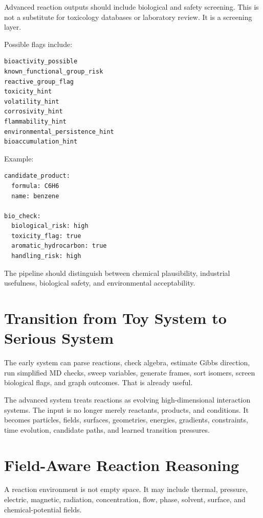 \documentclass[11pt]{article}
\begin{document}
Advanced reaction outputs should include biological and safety screening. This is not a substitute for toxicology databases or laboratory review. It is a screening layer.

Possible flags include:

\begin{lstlisting}[caption={Safety screening channels}]
bioactivity_possible
known_functional_group_risk
reactive_group_flag
toxicity_hint
volatility_hint
corrosivity_hint
flammability_hint
environmental_persistence_hint
bioaccumulation_hint
\end{lstlisting}

Example:

\begin{lstlisting}[caption={Example safety flag output}]
candidate_product:
  formula: C6H6
  name: benzene

bio_check:
  biological_risk: high
  toxicity_flag: true
  aromatic_hydrocarbon: true
  handling_risk: high
\end{lstlisting}

The pipeline should distinguish between chemical plausibility, industrial usefulness, biological safety, and environmental acceptability.

\section{Transition from Toy System to Serious System}

The early system can parse reactions, check algebra, estimate Gibbs direction, run simplified MD checks, sweep variables, generate frames, sort isomers, screen biological flags, and graph outcomes. That is already useful.

The advanced system treats reactions as evolving high-dimensional interaction systems. The input is no longer merely reactants, products, and conditions. It becomes particles, fields, surfaces, geometries, energies, gradients, constraints, time evolution, candidate paths, and learned transition pressures.

\section{Field-Aware Reaction Reasoning}

A reaction environment is not empty space. It may include thermal, pressure, electric, magnetic, radiation, concentration, flow, phase, solvent, surface, and chemical-potential fields.
\end{document}
